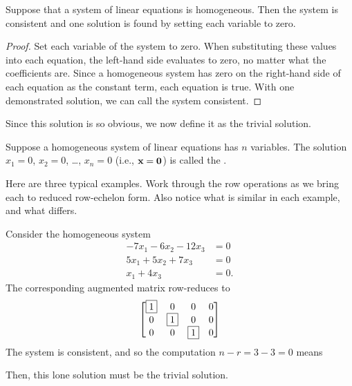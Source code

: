 \documentclass{ximera}
\begin{document}
\begin{theorem}
\label{theorem:HSC}
Suppose that a system of linear equations is homogeneous.  Then the system is consistent and one solution is found by setting each variable to zero.

\begin{proof}
  Set each variable of the system to zero.  When substituting these
  values into each equation, the left-hand side evaluates to zero, no
  matter what the coefficients are.  Since a homogeneous system has
  zero on the right-hand side of each equation as the constant term,
  each equation is true.  With one demonstrated solution, we can call
  the system consistent.
\end{proof}
\end{theorem}

Since this solution is so obvious, we now define it as the trivial
solution.

\begin{definition}
  Suppose a homogeneous system of linear equations has $n$ variables.
  The solution $x_1=0$, $x_2=0$, \ldots, $x_n=0$ (i.e.,
  $\mathbf{x}=\mathbf{0}$) is called the .
\end{definition}

Here are three typical examples.  Work through the row operations as
we bring each to reduced row-echelon form.  Also notice what is
similar in each example, and what differs.

\begin{example}
  Consider the homogeneous system
  \begin{align*}
    -7x_1 -6 x_2 - 12x_3 &=0\\
    5x_1  + 5x_2 + 7x_3 &=0\\
    x_1 +4x_3 &=0.
  \end{align*}
  The corresponding augmented matrix row-reduces to
  \[
    \begin{bmatrix}
      \fbox{1} & 0 & 0 & 0\\
      0 & \fbox{1} & 0 & 0\\
      0 & 0 & \fbox{1} & 0
    \end{bmatrix}
  \]
  The system is consistent, and so the computation $n-r=3-3=0$ means 
  \begin{multipleChoice}
  \end{multipleChoice}
  
  \begin{feedback}[correct]
    Then, this lone solution must be the trivial solution.  
  \end{feedback}
\end{example}
\end{document}
